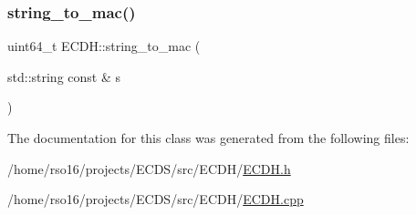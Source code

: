 \mbox{\label{classECDH_a0b5fb1d5817ba51fe4e055190c3c88f2}} 
\subsubsection{\texorpdfstring{string\+\_\+to\+\_\+mac()}{string\_to\_mac()}}
{\footnotesize\ttfamily uint64\+\_\+t E\+C\+D\+H\+::string\+\_\+to\+\_\+mac (\begin{DoxyParamCaption}\item[{std\+::string const \&}]{s }\end{DoxyParamCaption})}



The documentation for this class was generated from the following files\+:\begin{DoxyCompactItemize}
\item 
/home/rso16/projects/\+E\+C\+D\+S/src/\+E\+C\+D\+H/\hyperlink{ECDH_8h}{E\+C\+D\+H.\+h}\item 
/home/rso16/projects/\+E\+C\+D\+S/src/\+E\+C\+D\+H/\hyperlink{ECDH_8cpp}{E\+C\+D\+H.\+cpp}\end{DoxyCompactItemize}
